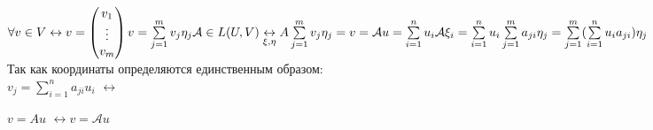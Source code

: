 \documentclass[12pt]{article}
\theoremstyle{remark}
\theoremstyle{definition}
\newcommand{\0}{\mathbb{0}}
\newcommand{\mybox}{
	\collectbox{
		\setlength{\fboxsep}{1pt}
		\fbox{\BOXCONTENT}
	}
}
\newcommand{\A}{\mathcal{A}}
\begin{document}
	$\forall v\in V \leftrightarrow v = \begin{pmatrix}
		v_1\\
		\vdots\\
		v_m
	\end{pmatrix}\\	
	v = \sum\limits_{j=1}^{m}v_j\eta_j\\
	\A\in L(U, V) \underset{\xi, \eta}{\leftrightarrow} A\\
	\sum\limits_{j=1}^m v_j\eta_j = v = \A u = \sum\limits_{i=1}^n u_i\A\xi_i = \sum\limits_{i=1}^n u_i
	\sum\limits_{j=1}^m a_{ji}\eta_j = \sum\limits_{j=1}^m (\sum\limits_{i=1}^n u_i a_{ji})\eta_j$\\
	Так как координаты определяются единственным образом:\\
	\mybox{ 
		$ v_j = \sum\limits_{i=1}^n a_{ji}u_i $ 
	} 
	$\leftrightarrow$ 
	\mybox{$v = Au$} $\leftrightarrow v = \A u$
\end{document}

